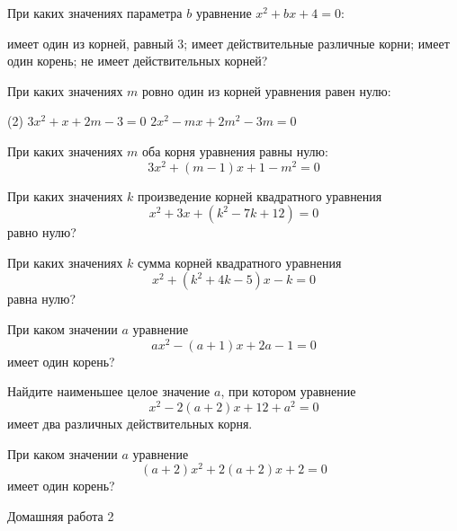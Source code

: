 \begin{class}[number=3]
	\begin{listofex}
		\item При каких значениях параметра \(b\) уравнение \(x^2+bx+4=0\):
		\begin{tasks}
			\task имеет один из корней, равный \( 3 \);
			\task имеет действительные различные корни;
			\task имеет один корень;
			\task не имеет действительных корней?
		\end{tasks}
		\item При каких значениях \(m\) ровно один из корней уравнения равен нулю:
		\begin{tasks}(2)
			\task \( 3x^2+x+2m-3=0 \)
			\task \( 2x^2-mx+2m^2-3m=0 \)
		\end{tasks}
		\item При каких значениях \(m\) оба корня уравнения равны нулю: \[ 3x^2+(m-1)x+1-m^2=0 \]
		\item При каких значениях \(k\) произведение корней квадратного уравнения \[x^2+3x+(k^2-7k+12)=0\] равно нулю?
		\item При каких значениях \(k\) сумма корней квадратного уравнения \[x^2+(k^2+4k-5)x-k=0\] равна нулю?
		\item При каком значении \(a\) уравнение \[ax^2-(a+1)x+2a-1=0\] имеет один корень?
		\item Найдите наименьшее целое значение \(a\), при котором уравнение \[x^2-2(a+2)x+12+a^2=0\] имеет два различных действительных корня.
		\item При каком значении \(a\) уравнение \[(a+2)x^2+2(a+2)x+2=0\] имеет один корень?
	\end{listofex}
\end{class}

\begin{class}[number=4]
	\begin{listofex}
		\item 
	\end{listofex}
\end{class}

\begin{homework}[number=2]
	\begin{listofex}
		\item Домашняя работа 2
	\end{listofex}
\end{homework}

